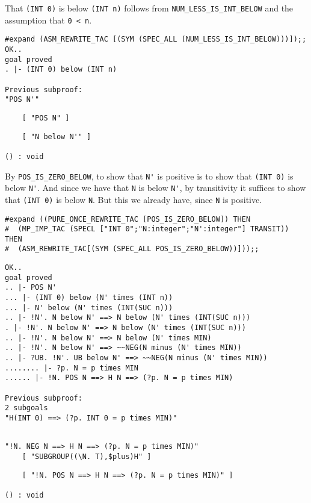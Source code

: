 That {\small\verb+(INT 0)+} is below {\small\verb+(INT n)+} follows
from {\small\verb+NUM_LESS_IS_INT_BELOW+} and the assumption that
{\small\verb+0 < n+}.
\begin{session}
\begin{verbatim}
#expand (ASM_REWRITE_TAC [(SYM (SPEC_ALL (NUM_LESS_IS_INT_BELOW)))]);;
OK..
goal proved
. |- (INT 0) below (INT n)

Previous subproof:
"POS N'"
\end{verbatim}
\mvdots
\begin{verbatim}
    [ "POS N" ]
\end{verbatim}
\mvdots
\begin{verbatim}
    [ "N below N'" ]

() : void
\end{verbatim}
\end{session}

By {\small\verb+POS_IS_ZERO_BELOW+}, to show that {\small\verb+N'+} is
positive is to show that {\small\verb+(INT 0)+} is below
{\small\verb+N'+}.  And since we have that {\small\tt N} is below
{\small\verb+N'+}, by transitivity it suffices to show that
{\small\verb+(INT 0)+} is below {\small\tt N}.  But this we already
have, since {\small\tt N} is positive.
\begin{session}
\begin{verbatim}
#expand ((PURE_ONCE_REWRITE_TAC [POS_IS_ZERO_BELOW]) THEN
#  (MP_IMP_TAC (SPECL ["INT 0";"N:integer";"N':integer"] TRANSIT)) THEN
#  (ASM_REWRITE_TAC[(SYM (SPEC_ALL POS_IS_ZERO_BELOW))]));;
\end{verbatim}
\mvdots
\begin{verbatim}
OK..
goal proved
.. |- POS N'
... |- (INT 0) below (N' times (INT n))
... |- N' below (N' times (INT(SUC n)))
.. |- !N'. N below N' ==> N below (N' times (INT(SUC n)))
. |- !N'. N below N' ==> N below (N' times (INT(SUC n)))
.. |- !N'. N below N' ==> N below (N' times MIN)
.. |- !N'. N below N' ==> ~~NEG(N minus (N' times MIN))
.. |- ?UB. !N'. UB below N' ==> ~~NEG(N minus (N' times MIN))
........ |- ?p. N = p times MIN
...... |- !N. POS N ==> H N ==> (?p. N = p times MIN)

Previous subproof:
2 subgoals
"H(INT 0) ==> (?p. INT 0 = p times MIN)"
\end{verbatim}
\mvdots
\begin{verbatim}

"!N. NEG N ==> H N ==> (?p. N = p times MIN)"
    [ "SUBGROUP((\N. T),$plus)H" ]
\end{verbatim}
\mvdots
\begin{verbatim}
    [ "!N. POS N ==> H N ==> (?p. N = p times MIN)" ]

() : void

\end{verbatim}
\end{session}


